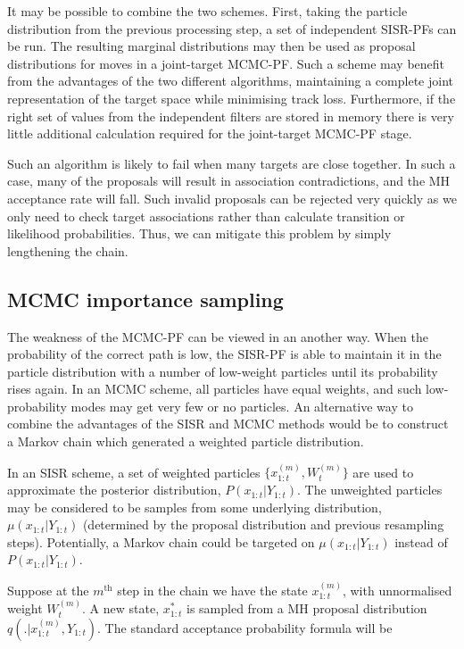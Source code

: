 It may be possible to combine the two schemes. First, taking the particle distribution from the previous processing step, a set of independent SISR-PFs can be run. The resulting marginal distributions may then be used as proposal distributions for moves in a joint-target MCMC-PF. Such a scheme may benefit from the advantages of the two different algorithms, maintaining a complete joint representation of the target space while minimising track loss. Furthermore, if the right set of values from the independent filters are stored in memory there is very little additional calculation required for the joint-target MCMC-PF stage.

Such an algorithm is likely to fail when many targets are close together. In such a case, many of the proposals will result in association contradictions, and the MH acceptance rate will fall. Such invalid proposals can be rejected very quickly as we only need to check target associations rather than calculate transition or likelihood probabilities. Thus, we can mitigate this problem by simply lengthening the chain.



\subsection{MCMC importance sampling}
The weakness of the MCMC-PF can be viewed in an another way. When the probability of the correct path is low, the SISR-PF is able to maintain it in the particle distribution with a number of low-weight particles until its probability rises again. In an MCMC scheme, all particles have equal weights, and such low-probability modes may get very few or no particles. An alternative way to combine the advantages of the SISR and MCMC methods would be to construct a Markov chain which generated a weighted particle distribution.

In an SISR scheme, a set of weighted particles $\{ x_{1:t}^{(m)}, W_t^{(m)} \}$ are used to approximate the posterior distribution, $P(x_{1:t}|Y_{1:t})$. The unweighted particles may be considered to be samples from some underlying distribution, $\mu(x_{1:t}|Y_{1:t})$ (determined by the proposal distribution and previous resampling steps). Potentially, a Markov chain could be targeted on $\mu(x_{1:t}|Y_{1:t})$ instead of $P(x_{1:t}|Y_{1:t})$.

Suppose at the $m^{\text{th}}$ step in the chain we have the state $x_{1:t}^{(m)}$, with unnormalised weight $W_t^{(m)}$. A new state, $x_{1:t}^{*}$ is sampled from a MH proposal distribution $q(.|x_{1:t}^{(m)}, Y_{1:t})$. The standard acceptance probability formula will be


